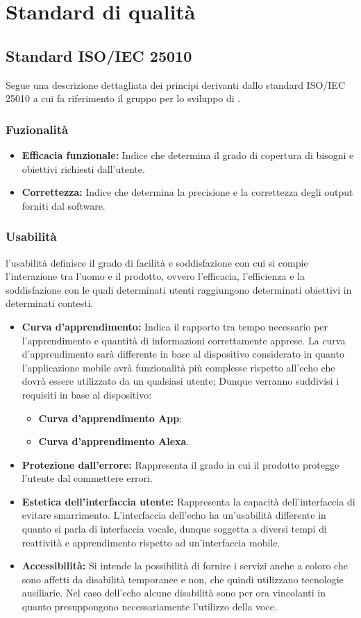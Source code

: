 \chapter{Standard di qualità}

\section{Standard ISO/IEC 25010}
Segue una descrizione dettagliata dei principi derivanti dallo standard ISO/IEC 25010 a cui fa riferimento il gruppo per lo sviluppo di .

\subsection{Fuzionalità}
\begin{itemize}
	\item \textbf{Efficacia funzionale:} Indice che determina il grado di copertura di bisogni e obiettivi richiesti dall'utente.
	\item \textbf{Correttezza:} Indice che determina la precisione e la correttezza degli output forniti dal software.
\end{itemize}
\subsection{Usabilità}
l'usabilità definisce il grado di facilità e soddisfazione con cui si compie l'interazione tra l'uomo e il prodotto, ovvero l'efficacia, l'efficienza e la soddisfazione con le quali determinati utenti raggiungono determinati obiettivi in determinati contesti.
\begin{itemize}
	\item \textbf{Curva d'apprendimento:} Indica il rapporto tra tempo necessario per l'apprendimento e quantità di informazioni correttamente apprese.
	La curva d'apprendimento sarà differente in base al dispositivo considerato in quanto l'applicazione mobile avrà funzionalità più complesse rispetto all'echo che dovrà essere utilizzato da un qualsiasi utente;
	Dunque verranno suddivisi i requisiti in base al dispositivo:
	\begin{itemize}
		\item \textbf{Curva d'apprendimento App};
		\item \textbf{Curva d'apprendimento Alexa}.
	\end{itemize}
	\item \textbf{Protezione dall'errore:} Rappresenta il grado in cui il prodotto protegge l'utente dal commettere errori.
	\item \textbf{Estetica dell'interfaccia utente:} Rappresenta la capacità dell'interfaccia di evitare smarrimento.
	L'interfaccia dell'echo ha un'usabilità differente  in quanto si parla di interfaccia vocale, dunque soggetta a diversi tempi di reattività e apprendimento rispetto ad un'interfaccia mobile.
	\item \textbf{Accessibilità:}  Si intende la possibilità di fornire i servizi anche a coloro che sono affetti da disabilità temporanee e non, che quindi utilizzano tecnologie ausiliarie.
	Nel caso dell'echo alcune disabilità sono per ora vincolanti in quanto presuppongono necessariamente l'utilizzo della voce.
\end{itemize}
